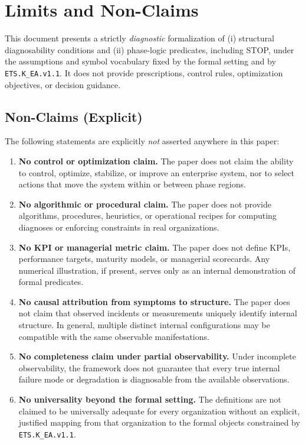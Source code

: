 ﻿\section{Limits and Non-Claims}
\label{sec:limits-nonclaims}

This document presents a strictly \emph{diagnostic} formalization of
(i) structural diagnosability conditions and
(ii) phase-logic predicates, including STOP,
under the assumptions and symbol vocabulary fixed by the formal setting and by
\texttt{ETS.K\_EA.v1.1}.
It does not provide prescriptions, control rules, optimization objectives, or
decision guidance.

\subsection{Non-Claims (Explicit)}
\label{subsec:nonclaims-explicit}

The following statements are explicitly \emph{not} asserted anywhere in this
paper:

\begin{enumerate}
  \item \textbf{No control or optimization claim.}
  The paper does not claim the ability to control, optimize, stabilize, or
  improve an enterprise system, nor to select actions that move the system within
  or between phase regions.

  \item \textbf{No algorithmic or procedural claim.}
  The paper does not provide algorithms, procedures, heuristics, or operational
  recipes for computing diagnoses or enforcing constraints in real organizations.

  \item \textbf{No KPI or managerial metric claim.}
  The paper does not define KPIs, performance targets, maturity models, or
  managerial scorecards.
  Any numerical illustration, if present, serves only as an internal
  demonstration of formal predicates.

  \item \textbf{No causal attribution from symptoms to structure.}
  The paper does not claim that observed incidents or measurements uniquely
  identify internal structure.
  In general, multiple distinct internal configurations may be compatible with
  the same observable manifestations.

  \item \textbf{No completeness claim under partial observability.}
  Under incomplete observability, the framework does not guarantee that every
  true internal failure mode or degradation is diagnosable from the available
  observations.

  \item \textbf{No universality beyond the formal setting.}
  The definitions are not claimed to be universally adequate for every
  organization without an explicit, justified mapping from that organization to
  the formal objects constrained by \texttt{ETS.K\_EA.v1.1}.
\end{enumerate}

